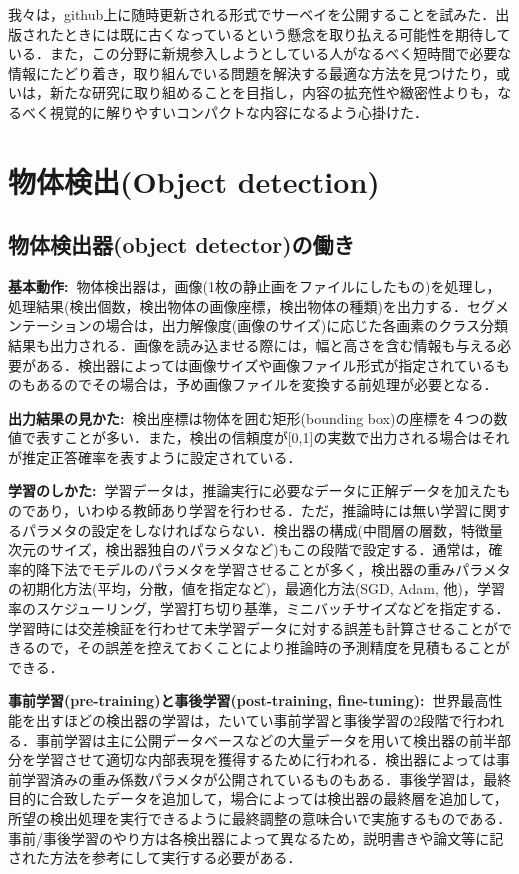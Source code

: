 \documentclass[originalpaper]{jsaiart}     %
\begin{document}
我々は，github上に随時更新される形式でサーベイを公開することを試みた．出版されたときには既に古くなっているという懸念を取り払える可能性を期待している．また，この分野に新規参入しようとしている人がなるべく短時間で必要な情報にたどり着き，取り組んでいる問題を解決する最適な方法を見つけたり，或いは，新たな研究に取り組めることを目指し，内容の拡充性や緻密性よりも，なるべく視覚的に解りやすいコンパクトな内容になるよう心掛けた．

\section{物体検出(Object detection)}
\subsection{物体検出器(object detector)の働き}
{\bf 基本動作:\ }物体検出器は，画像(1枚の静止画をファイルにしたもの)を処理し，処理結果(検出個数，検出物体の画像座標，検出物体の種類)を出力する．セグメンテーションの場合は，出力解像度(画像のサイズ)に応じた各画素のクラス分類結果も出力される．画像を読み込ませる際には，幅と高さを含む情報も与える必要がある．検出器によっては画像サイズや画像ファイル形式が指定されているものもあるのでその場合は，予め画像ファイルを変換する前処理が必要となる．

{\bf 出力結果の見かた:\ }検出座標は物体を囲む矩形(bounding box)の座標を４つの数値で表すことが多い．また，検出の信頼度が[0,1]の実数で出力される場合はそれが推定正答確率を表すように設定されている．

{\bf 学習のしかた:\ }学習データは，推論実行に必要なデータに正解データを加えたものであり，いわゆる教師あり学習を行わせる．ただ，推論時には無い学習に関するパラメタの設定をしなければならない．検出器の構成(中間層の層数，特徴量次元のサイズ，検出器独自のパラメタなど)もこの段階で設定する．通常は，確率的降下法でモデルのパラメタを学習させることが多く，検出器の重みパラメタの初期化方法(平均，分散，値を指定など)，最適化方法(SGD, Adam, 他)，学習率のスケジューリング，学習打ち切り基準，ミニバッチサイズなどを指定する．学習時には交差検証を行わせて未学習データに対する誤差も計算させることができるので，その誤差を控えておくことにより推論時の予測精度を見積もることができる．

{\bf 事前学習(pre-training)と事後学習(post-training, fine-tuning):\ }世界最高性能を出すほどの検出器の学習は，たいてい事前学習と事後学習の2段階で行われる．事前学習は主に公開データベースなどの大量データを用いて検出器の前半部分を学習させて適切な内部表現を獲得するために行われる．検出器によっては事前学習済みの重み係数パラメタが公開されているものもある．事後学習は，最終目的に合致したデータを追加して，場合によっては検出器の最終層を追加して，所望の検出処理を実行できるように最終調整の意味合いで実施するものである．事前/事後学習のやり方は各検出器によって異なるため，説明書きや論文等に記された方法を参考にして実行する必要がある．
\end{document}
